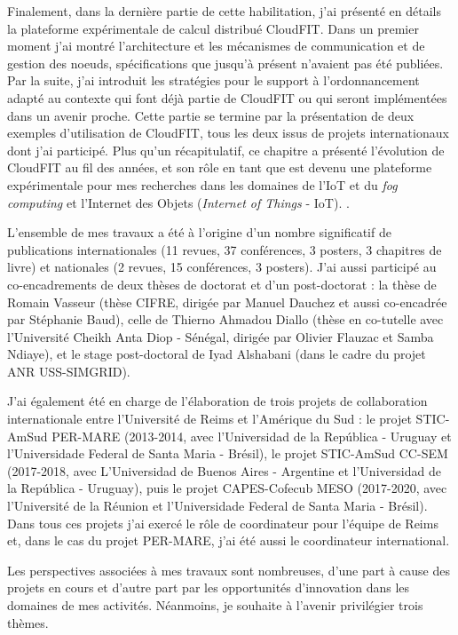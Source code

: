 Finalement, dans la dernière partie de cette habilitation, j'ai présenté en détails la plateforme expérimentale de calcul distribué CloudFIT. Dans un premier moment j'ai montré l'architecture et les mécanismes de communication et de gestion des n{oe}uds, spécifications que jusqu'à présent n'avaient pas été publiées. Par la suite, j'ai introduit les stratégies pour le support à l'ordonnancement adapté au contexte qui font déjà partie de CloudFIT ou qui seront implémentées dans un avenir proche. Cette partie se termine par la présentation de deux exemples d'utilisation de CloudFIT, tous les deux issus de projets internationaux dont j'ai participé. Plus qu'un récapitulatif, ce chapitre a présenté l'évolution de  CloudFIT au fil des années, et son rôle en tant que est devenu une plateforme expérimentale pour mes recherches dans les domaines de l'IoT et du  \textit{fog computing} et l'Internet des Objets (\textit{Internet of Things} - IoT). .

L'ensemble de mes travaux a été à l'origine d'un nombre significatif de publications internationales (11 revues, 37 conférences, 3 posters, 3 chapitres de livre) et nationales (2 revues, 15 conférences, 3 posters). J'ai aussi participé au co-encadrements de deux thèses de doctorat et d'un post-doctorat : la thèse de Romain Vasseur (thèse CIFRE, dirigée par Manuel Dauchez et aussi co-encadrée par Stéphanie Baud), celle de Thierno Ahmadou Diallo (thèse en co-tutelle avec l'Université Cheikh Anta Diop - Sénégal, dirigée par Olivier Flauzac et Samba Ndiaye), et le stage post-doctoral de Iyad Alshabani (dans le cadre du projet ANR USS-SIMGRID). 

J'ai également été en charge de l'élaboration de trois projets de collaboration internationale entre l'Université de Reims et l'Amérique du Sud : le projet STIC-AmSud PER-MARE (2013-2014, avec l'Universidad de la República - Uruguay et l'Universidade Federal de Santa Maria - Brésil), le projet STIC-AmSud CC-SEM (2017-2018, avec L'Universidad de Buenos Aires - Argentine et l'Universidad de la República - Uruguay), puis le projet CAPES-Cofecub MESO (2017-2020, avec l'Université de la Réunion et  l'Universidade Federal de Santa Maria - Brésil). Dans tous ces projets j'ai exercé le rôle de coordinateur pour l'équipe de Reims et, dans le cas du projet PER-MARE, j'ai été aussi le coordinateur international.

Les perspectives associées à mes travaux sont nombreuses, d'une part à cause des projets en cours et d'autre part par les opportunités d'innovation dans les domaines de mes activités. Néanmoins, je souhaite à l'avenir privilégier trois thèmes.

